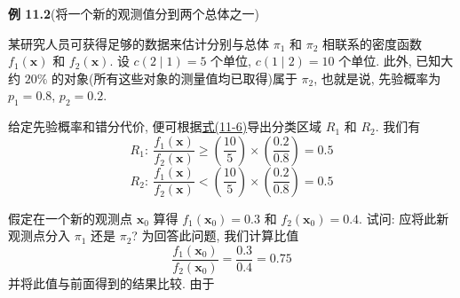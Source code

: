 \noindent\textbf{例 11.2}\quad (将一个新的观测值分到两个总体之一)

某研究人员可获得足够的数据来估计分别与总体 $\pi_1$ 和 $\pi_2$ 相联系的密度函数 $f_1(\mathbf{x})$ 和 $f_2(\mathbf{x})$. 设 $c(2\mid1)=5$ 个单位, $c(1\mid2)=10$ 个单位. 此外, 已知大约 $20\%$ 的对象(所有这些对象的测量值均已取得)属于 $\pi_2$, 也就是说, 先验概率为 $p_1=0.8$, $p_2=0.2$.

给定先验概率和错分代价, 便可根据\hyperref[eq:11-6]{式(11-6)}导出分类区域 $R_1$ 和 $R_2$. 我们有
\[
R_1:\ \frac{f_1(\mathbf{x})}{f_2(\mathbf{x})}\geqslant\left(\frac{10}{5}\right)\times\left(\frac{0.2}{0.8}\right)=0.5
\]
\[
R_2:\ \frac{f_1(\mathbf{x})}{f_2(\mathbf{x})}<\left(\frac{10}{5}\right)\times\left(\frac{0.2}{0.8}\right)=0.5
\]

假定在一个新的观测点 $\mathbf{x}_0$ 算得 $f_1(\mathbf{x}_0)=0.3$ 和 $f_2(\mathbf{x}_0)=0.4$. 试问: 应将此新观测点分入 $\pi_1$ 还是 $\pi_2$? 为回答此问题, 我们计算比值
\[
\frac{f_1(\mathbf{x}_0)}{f_2(\mathbf{x}_0)}=\frac{0.3}{0.4}=0.75
\]
并将此值与前面得到的结果比较. 由于
